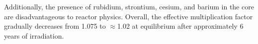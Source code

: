 Additionally, the presence of rubidium, strontium, cesium, and barium in the 
core are disadvantageous to reactor physics. Overall, the effective 
multiplication factor gradually decreases from 1.075 to $\approx$1.02 at 
equilibrium after approximately 6 years of irradiation. 



